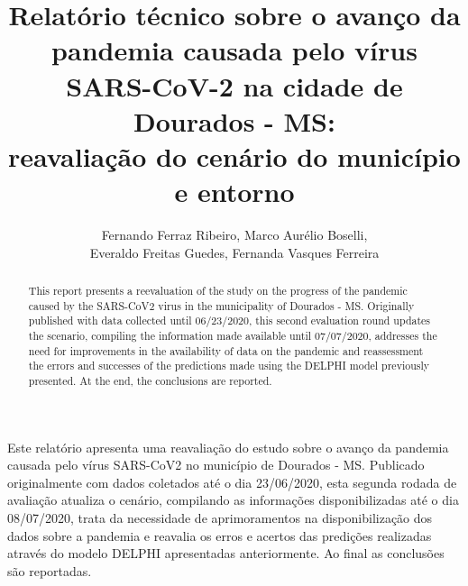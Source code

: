 \documentclass[12pt]{article}
\begin{document}
 


\title{Relatório técnico sobre o avanço da pandemia causada pelo vírus SARS-CoV-2 na cidade de Dourados - MS:\\ reavaliação do cenário do município e entorno}

\author{Fernando Ferraz Ribeiro, Marco Aurélio Boselli,\\ Everaldo Freitas Guedes, Fernanda Vasques Ferreira}
  

 

\address{Universidade Federal da Bahia -- Faculdade de Arquitetura -- LCAD
  (UFBA)\\
  Salvador, BA -- Brasil
\nextinstitute
  Universidade Federal de Uberlândia  -- Instituto de Física (UFU)\\
  Uberlândia, MG -- Brasil 
\nextinstitute
  Bacharel em Estatística, Doutor e Mestre em \\Modelagem Computacional Aplicada à Tecnologia Industrial\\
  Salvador, BA -- Brasil
\nextinstitute
  Universidade Federal do Oeste da Bahia (UFOB)\\
  Santa Maria da Vitória, BA -- Brasil
}


\maketitle

\begin{abstract}

  This report presents a reevaluation of the study on the progress of the pandemic caused by the SARS-CoV2 virus in the municipality of Dourados - MS. Originally published with data collected until 06/23/2020, this second evaluation round updates the scenario, compiling the information made available until 07/07/2020, addresses the need for improvements in the availability of data on the pandemic and reassessment the errors and successes of the predictions made using the DELPHI model previously presented. At the end, the conclusions are reported.

\end{abstract}
     
\begin{resumo}

  Este relatório apresenta uma reavaliação do estudo sobre o avanço da pandemia causada pelo vírus SARS-CoV2 no município de Dourados - MS. Publicado originalmente com dados coletados até o dia 23/06/2020, esta segunda rodada de avaliação atualiza o cenário, compilando as informações disponibilizadas até o dia 08/07/2020,  trata da necessidade de aprimoramentos na disponibilização dos dados sobre a pandemia e reavalia os erros e acertos das predições realizadas através do modelo DELPHI apresentadas anteriormente. Ao final as conclusões são reportadas.

\end{resumo}
\end{document}

